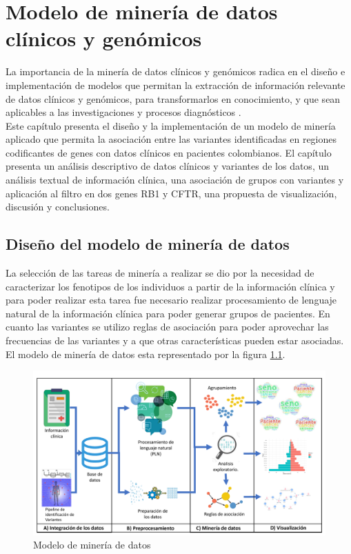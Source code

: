 \chapter{Modelo de minería de datos clínicos y genómicos}

La importancia de la minería de datos clínicos y genómicos radica en el diseño e implementación de modelos que permitan la extracción de información relevante de datos clínicos y genómicos, para transformarlos en conocimiento, y que sean aplicables a las investigaciones y procesos diagnósticos \cite{Farid2016}. \\  

Este capítulo presenta el diseño y la implementación de un modelo de minería aplicado que permita la asociación entre las variantes identificadas en regiones codificantes de genes con datos clínicos en pacientes colombianos. El capítulo presenta un análisis descriptivo de datos clínicos y variantes de los datos, un análisis textual de información clínica, una asociación de grupos con variantes y aplicación al filtro en dos genes RB1 y CFTR, una propuesta de visualización, discusión y conclusiones. 

\section{Diseño del modelo de minería de datos}

La selección de las tareas de minería a realizar se dio por la necesidad de caracterizar los fenotipos de los individuos a partir de la información clínica y para poder realizar esta tarea fue necesario realizar procesamiento de lenguaje natural de la información clínica  para poder generar grupos de pacientes. En cuanto las variantes se utilizo reglas de asociación para poder aprovechar las frecuencias de las variantes y a que otras características pueden estar asociadas. El modelo de minería de datos esta representado por la figura  \ref{fig:kdd}.\\

\begin{figure}[]
	\centering
	\includegraphics[width=1\textwidth]{Kap4/KDDtesis.pdf}
	\caption{Modelo de minería de datos}
	\label{fig:kdd}
\end{figure}



